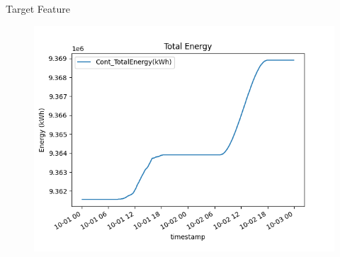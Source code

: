  
  \begin{frame}{Target Feature}
      \begin{figure}
          \centering
          \includegraphics[width=.9\textwidth]{sections/1_dataset/imgs/totalenergy.png}
      \end{figure}
  \end{frame}